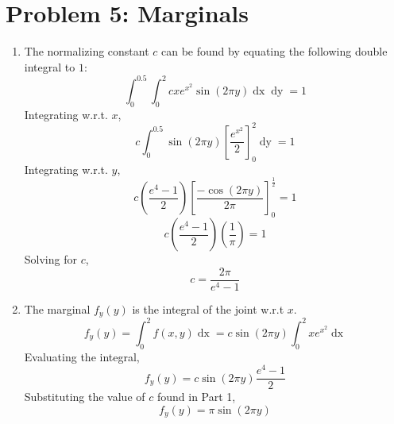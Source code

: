 \documentclass[a4paper]{article}
\begin{document}
\section{Problem 5: Marginals}
\begin{enumerate}
\item The normalizing constant $c$ can be found by equating the following double integral to $1$:
\begin{equation}
\int_0^{0.5}\int_0^2cxe^{x^2}\sin\left(2\pi y\right)\mathop{dx}\mathop{dy} = 1
\end{equation}
Integrating w.r.t. $x$,
\begin{equation}
c\int_0^{0.5}\sin\left(2\pi y\right)\left[\frac{e^{x^2}}{2}\right]_0^2 \mathop{dy} = 1
\end{equation}
Integrating w.r.t. $y$,
\begin{equation}
c\left(\frac{e^4-1}{2}\right)\left[\frac{-\cos (2\pi y)}{2\pi}\right]_0^\frac{1}{2} = 1
\end{equation}
\begin{equation}
c\left(\frac{e^4-1}{2}\right)\left(\frac{1}{\pi}\right)=1
\end{equation}
Solving for $c$,
\begin{equation}
c=\frac{2\pi}{e^4-1}
\end{equation}

\item The marginal $f_y(y)$ is the integral of the joint w.r.t $x$.
\begin{equation}
f_y(y)=\int_0^2 f(x,y)\mathop{dx} = c\sin(2\pi y)\int_0^2 xe^{x^2} \mathop{dx}
\end{equation}
Evaluating the integral,
\begin{equation}
f_y(y)=c\sin(2\pi y)\frac{e^4-1}{2}
\end{equation}
Substituting the value of $c$ found in Part 1,
\begin{equation}
f_y(y)=\pi\sin(2\pi y)
\end{equation}
\end{enumerate}
\end{document}
